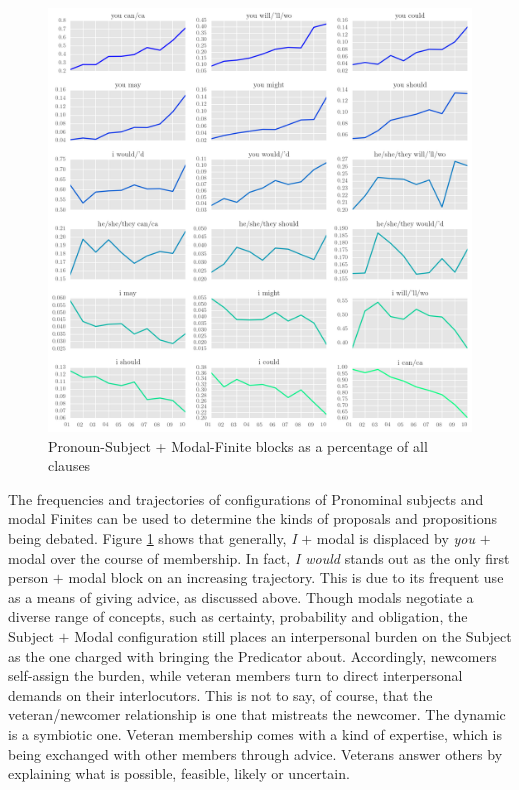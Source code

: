 \begin{figure}
    \centering
    \includegraphics[width=1\textwidth]{../images/subj-fin-const-p-page.png}
    \caption[Pronoun-Subject + Modal-Finite blocks]{Pronoun-Subject + Modal-Finite blocks as a percentage of all clauses}
    \label{fig:modal_constellations}
    \end{figure}%
%
The frequencies and trajectories of configurations of Pronominal subjects and modal Finites can be used to determine the kinds of proposals and propositions being debated. Figure \ref{fig:modal_constellations} shows that generally, \emph{I} $+$ modal is displaced by \emph{you} $+$ modal over the course of membership. In fact, \emph{I would} stands out as the only first person $+$ modal block on an increasing trajectory. This is due to its frequent use as a means of giving advice, as discussed above. Though modals negotiate a diverse range of concepts, such as certainty, probability and obligation, the Subject $+$ Modal configuration still places an interpersonal burden on the Subject as the one charged with bringing the Predicator about. Accordingly, newcomers self\hyp{}assign the burden, while veteran members turn to direct interpersonal demands on their interlocutors. This is not to say, of course, that the veteran\slash newcomer relationship is one that mistreats the newcomer. The dynamic is a symbiotic one. Veteran membership comes with a kind of expertise, which is being exchanged with other  members through advice. Veterans answer others by explaining what is possible, feasible, likely or uncertain.

